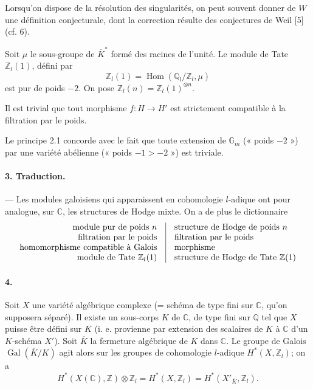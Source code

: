 \documentclass[10pt]{article}
\newcommand{\C}{\mathbb C}
\newcommand{\Q}{\mathbb Q}
\newcommand{\Z}{\mathbb Z}
\newcommand{\Gm}{\mathbb G_m}
\newcommand{\Gal}{\operatorname{Gal}}
\newcommand{\Hom}{\operatorname{Hom}}
\newcommand{\barK}{\overline{K}}
\begin{document}
Lorsqu'on dispose de la résolution des singularités, on peut souvent donner de $W$ une définition conjecturale, dont la correction résulte des conjectures de Weil [5] (cf. 6).

Soit $\mu$ le sous-groupe de $\barK^*$ formé des racines de l'unité. Le module de Tate $\Z_l(1)$, défini par
\[
\Z_l(1)=\Hom(\Q_l/\Z_l,\mu)
\]
est pur de poids $-2$. On pose $\Z_l(n)=\Z_l(1)^{\otimes n}$.

Il est trivial que tout morphisme $f:H\to H'$ est strictement compatible à la filtration par le poids.

Le principe 2.1 concorde avec le fait que toute extension de $\Gm$ (« poids $-2$ ») par une variété abélienne (« poids $-1>-2$ ») est triviale.

\paragraph{3. Traduction.} — Les modules galoisiens qui apparaissent en cohomologie $l$-adique ont pour analogue, sur $\C$, les structures de Hodge mixte. On a de plus le dictionnaire
\[
\begin{array}{r@{\quad\vrule\quad}l}
\text{module pur de poids }n & \text{structure de Hodge de poids }n\\
\text{filtration par le poids} & \text{filtration par le poids}\\
\text{homomorphisme compatible à Galois} & \text{morphisme}\\
\text{module de Tate }\Z_l(1) & \text{structure de Hodge de Tate }\Z(1)
\end{array}
\]

\paragraph{4.} Soit $X$ une variété algébrique complexe (= schéma de type fini sur $\C$, qu'on supposera séparé). Il existe un sous-corps $K$ de $\C$, de type fini sur $\Q$ tel que $X$ puisse être défini sur $K$ (i. e. provienne par extension des scalaires de $K$ à $\C$ d'un $K$-schéma $X'$). Soit $\barK$ la fermeture algébrique de $K$ dans $\C$. Le groupe de Galois $\Gal(\barK/K)$ agit alors sur les groupes de cohomologie $l$-adique $H^*(X,\Z_l)$; on a
\[
H^*(X(\C),\Z)\otimes\Z_l=H^*(X,\Z_l)=H^*(X'_{\barK},\Z_l).
\]
\end{document}
